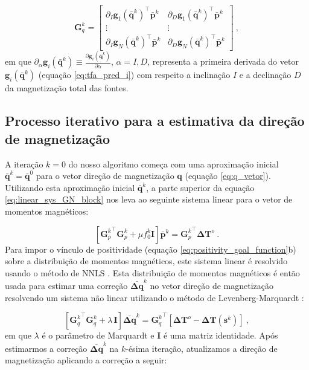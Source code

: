 \begin{equation}
\mathbf{G}_{q}^{k} = \begin{bmatrix}
\partial_{I} \mathbf{g}_{1}(\bar{\mathbf{q}}^{k})^{\top} \bar{\mathbf{p}}^{k} & 
\partial_{D} \mathbf{g}_{1}(\bar{\mathbf{q}}^{k})^{\top} \bar{\mathbf{p}}^{k} \\
\vdots & \vdots  \\
\partial_{I} \mathbf{g}_{N}(\bar{\mathbf{q}}^{k})^{\top} \bar{\mathbf{p}}^{k} & 
\partial_{D} \mathbf{g}_{N}(\bar{\mathbf{q}}^{k})^{\top} \bar{\mathbf{p}}^{k} 
\end{bmatrix} \: ,
\label{eq:Gq}
\end{equation}
em que $\partial_{\alpha} \mathbf{g}_{i}(\bar{\mathbf{q}}^{k}) \equiv \frac{\partial \mathbf{g}_{i}(\bar{\mathbf{q}}^{k})}{\partial \alpha}$, $\alpha= I, D$, representa a primeira derivada do vetor $\mathbf{g}_{i}(\bar{\mathbf{q}}^{k})$ (equação \ref{eq:tfa_pred_i}) com respeito a inclinação $I$ e a declinação $D$ da magnetização total das fontes.

\subsection{Processo iterativo para a estimativa da direção de magnetização}

A iteração $k=0$ do nosso algoritmo começa com uma aproximação inicial $\bar{\mathbf{q}}^{k} = \bar{\mathbf{q}}^{0}$ para o vetor direção de magnetização $\mathbf{q}$ (equação \ref{eq:q_vetor}). Utilizando esta aproximação inicial $\bar{\mathbf{q}}^{k}$, a parte superior da equação \ref{eq:linear_sys_GN_block} nos leva ao seguinte sistema linear para o vetor de momentos magnéticos:

\begin{equation}
\left[ {\mathbf{G}_{p}^{k}}^{\top} \mathbf{G}_{p}^{k} + 
\mu f_{0}^{k} \mathbf{I} \right] \bar{\mathbf{p}}^{k} = {\mathbf{G}_{p}^{k}}^{\top} \mathbf{\Delta T}^{o} \: .
\label{eq:linear_sys_p}
\end{equation}
Para impor o vínculo de positividade (equação \ref{eq:positivity_goal_function}b) sobre a distribuição de momentos magnéticos, este sistema linear é resolvido usando o método de NNLS \citep{lawson_hanson_1974, silvadias_etal_2010}. Esta distribuição de momentos magnéticos é então usada para estimar uma correção $\bar{\mathbf{\Delta q}}^{k}$ no vetor direção de magnetização resolvendo um sistema não linear utilizando o método de Levenberg-Marquardt \citep{aster2005}:

\begin{equation}
\left[ {\mathbf{G}_{q}^{k}}^{\top} \mathbf{G}_{q}^{k} + \lambda \, \mathbf{I} \right] 
\bar{\mathbf{\Delta q}}^{k} = {\mathbf{G}_{q}^{k}}^{\top} 
\left[ \mathbf{\Delta T}^{o} - \mathbf{\Delta T} (\mathbf{s}^{k}) \right] \: ,
\label{eq:linear_sys_q}
\end{equation}
em que $\lambda$ é o parâmetro de Marquardt e $\mathbf{I}$ é uma matriz identidade. Após estimarmos a correção $\bar{\mathbf{\Delta q}}^{k}$ na $k$-ésima iteração, atualizamos a direção de magnetização aplicando a correção a seguir:

